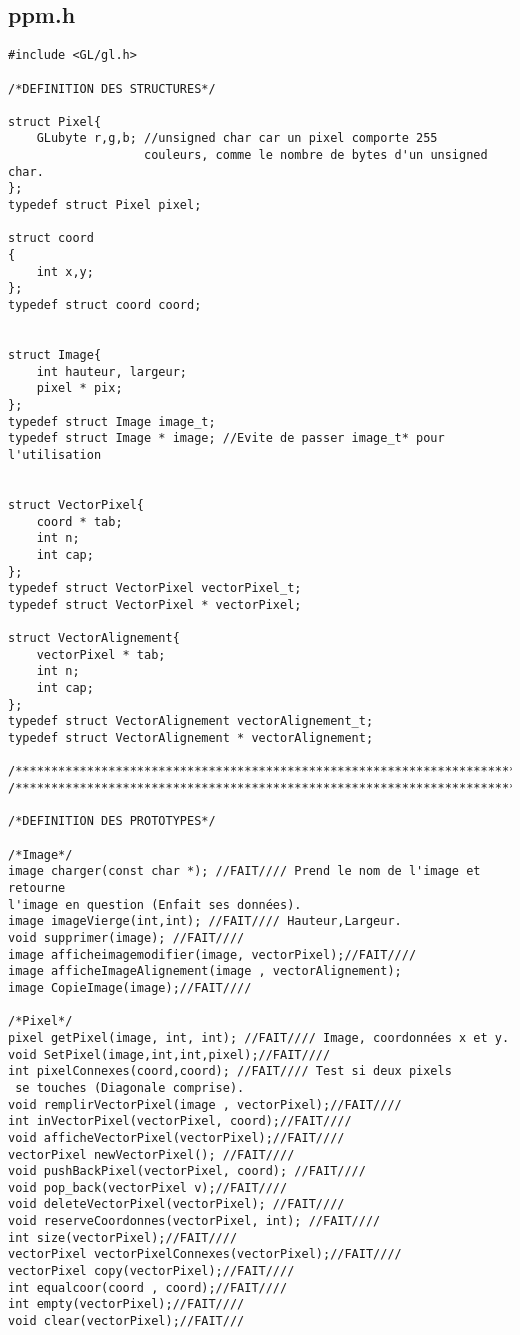 \documentclass[a4paper , 10pt]{article}
\begin{document}
\subsection{ppm.h}
\begin{verbatim}
#include <GL/gl.h>	

/*DEFINITION DES STRUCTURES*/

struct Pixel{
	GLubyte r,g,b; //unsigned char car un pixel comporte 255 
	               couleurs, comme le nombre de bytes d'un unsigned char.
};
typedef struct Pixel pixel;

struct coord
{
	int x,y;
};
typedef struct coord coord;


struct Image{
	int hauteur, largeur;
	pixel * pix;
};
typedef struct Image image_t;
typedef struct Image * image; //Evite de passer image_t* pour l'utilisation


struct VectorPixel{
	coord * tab;
	int n;
	int cap;
};
typedef struct VectorPixel vectorPixel_t;
typedef struct VectorPixel * vectorPixel;

struct VectorAlignement{
	vectorPixel * tab;
	int n;
	int cap;
};
typedef struct VectorAlignement vectorAlignement_t;
typedef struct VectorAlignement * vectorAlignement;

/**********************************************************************/
/**********************************************************************/

/*DEFINITION DES PROTOTYPES*/

/*Image*/
image charger(const char *); //FAIT//// Prend le nom de l'image et retourne 
l'image en question (Enfait ses données).
image imageVierge(int,int); //FAIT//// Hauteur,Largeur.
void supprimer(image); //FAIT////
image afficheimagemodifier(image, vectorPixel);//FAIT////
image afficheImageAlignement(image , vectorAlignement);
image CopieImage(image);//FAIT////

/*Pixel*/
pixel getPixel(image, int, int); //FAIT//// Image, coordonnées x et y.
void SetPixel(image,int,int,pixel);//FAIT////
int pixelConnexes(coord,coord); //FAIT//// Test si deux pixels
 se touches (Diagonale comprise).
void remplirVectorPixel(image , vectorPixel);//FAIT////
int inVectorPixel(vectorPixel, coord);//FAIT////
void afficheVectorPixel(vectorPixel);//FAIT////
vectorPixel newVectorPixel(); //FAIT////
void pushBackPixel(vectorPixel, coord); //FAIT////
void pop_back(vectorPixel v);//FAIT////
void deleteVectorPixel(vectorPixel); //FAIT////
void reserveCoordonnes(vectorPixel, int); //FAIT////
int size(vectorPixel);//FAIT////
vectorPixel vectorPixelConnexes(vectorPixel);//FAIT////
vectorPixel copy(vectorPixel);//FAIT////
int equalcoor(coord , coord);//FAIT////
int empty(vectorPixel);//FAIT////
void clear(vectorPixel);//FAIT///


\end{verbatim}
\end{document}
